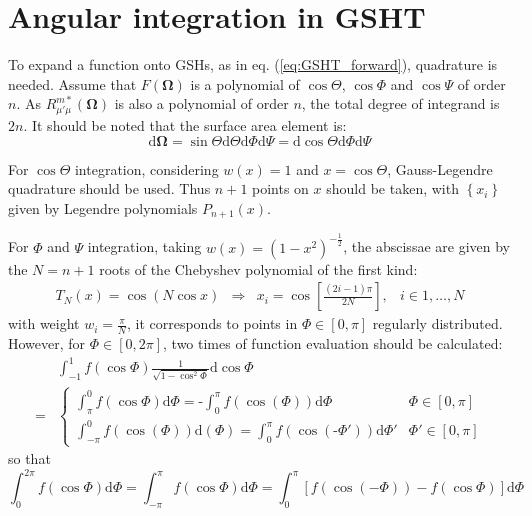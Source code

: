 \section{Angular integration in GSHT}

To expand a function onto GSHs, as in eq. (\ref{eq:GSHT_forward}),
quadrature is needed. Assume that $F(\mathbf{\Omega})$ is a polynomial
of $\cos\Theta$, $\cos\Phi$ and $\cos\Psi$ of order $n$. As $R_{\mu'\mu}^{m*}(\mathbf{\Omega})$
is also a polynomial of order $n$, the total degree of integrand
is $2n$. It should be noted that the surface area element is:
\begin{equation}
\mathrm{d}\mathbf{\Omega}=\sin\Theta\mathrm{d}\Theta\mathrm{d}\Phi\mathrm{d}\Psi=\mathrm{d}\cos\Theta\mathrm{d}\Phi\mathrm{d}\Psi
\end{equation}


For $\cos\Theta$ integration, considering $w(x)=1$ and $x=\cos\Theta$,
Gauss-Legendre quadrature should be used. Thus $n+1$ points on $x$
should be taken, with $\left\{ x_{i}\right\} $ given by Legendre
polynomials $P_{n+1}(x).$

For $\Phi$ and $\Psi$ integration, taking $w(x)=\left(1-x^{2}\right)^{-\frac{1}{2}}$,
the abscissae are given by the $N=n+1$ roots of the Chebyshev polynomial
of the first kind:
\begin{equation}
\begin{array}{cccc}
T_{N}(x)=\cos(N\cos x) & \Rightarrow & x_{i}=\cos\left[\frac{(2i-1)\pi}{2N}\right], & i\in1,\ldots,N\end{array}
\end{equation}
with weight $w_{i}=\frac{\pi}{N}$, it corresponds to points in $\Phi\in\left[0,\pi\right]$
regularly distributed. However, for $\Phi\in\left[0,2\pi\right]$,
two times of function evaluation should be calculated:
\begin{align}
 & \int_{-1}^{1}f(\cos\Phi)\frac{1}{\sqrt{1-\cos^{2}\Phi}}\mathrm{d}\cos\Phi\nonumber \\
= & \begin{cases}
\int_{\pi}^{0}f(\cos\Phi)\mathrm{d}\Phi=\text{-}\int_{0}^{\pi}f(\cos(\Phi))\mathrm{d}\Phi & \Phi\in[0,\pi]\\
\int_{-\pi}^{0}f(\cos(\Phi))\mathrm{d}(\Phi)=\int_{0}^{\pi}f(\cos(\text{-}\Phi'))\mathrm{d}\Phi' & \Phi'\in[0,\pi]
\end{cases}
\end{align}
so that
\begin{equation}
\int_{0}^{2\pi}f(\cos\Phi)\mathrm{d}\Phi=\int_{-\pi}^{\pi}f(\cos\Phi)\mathrm{d}\Phi=\int_{0}^{\pi}\left[f(\cos(-\Phi))-f(\cos\Phi)\right]\mathrm{d}\Phi
\end{equation}


